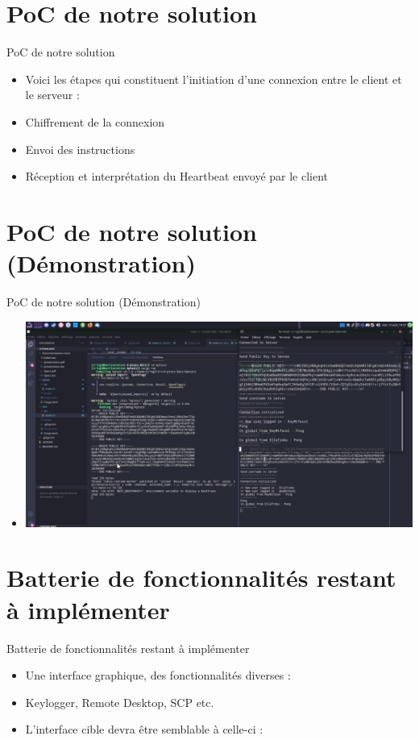\documentclass{beamer}
\begin{document}
\section{PoC de notre solution}
  \begin{frame}{PoC de notre solution}
  \begin{itemize}
	\item Voici les étapes qui constituent l'initiation d'une connexion entre le client et le serveur :
	\item Chiffrement de la connexion
	\item Envoi des instructions
	\item Réception et interprétation du Heartbeat envoyé par le client 
  \end{itemize}
  \end{frame}

\section{PoC de notre solution (Démonstration)}
  \begin{frame}{PoC de notre solution (Démonstration)}
  \begin{itemize}
	\item 
	 \includegraphics[scale=.4]{poc.png}
  \end{itemize}
  \end{frame}

\section{Batterie de fonctionnalités restant à implémenter}
  \begin{frame}{Batterie de fonctionnalités restant à implémenter}
  \begin{itemize}
	\item Une interface graphique, des fonctionnalités diverses :
	\item Keylogger, Remote Desktop, SCP etc.
	\item L'interface cible devra être semblable à celle-ci :
  \end{itemize}
  \end{frame}
\end{document}
